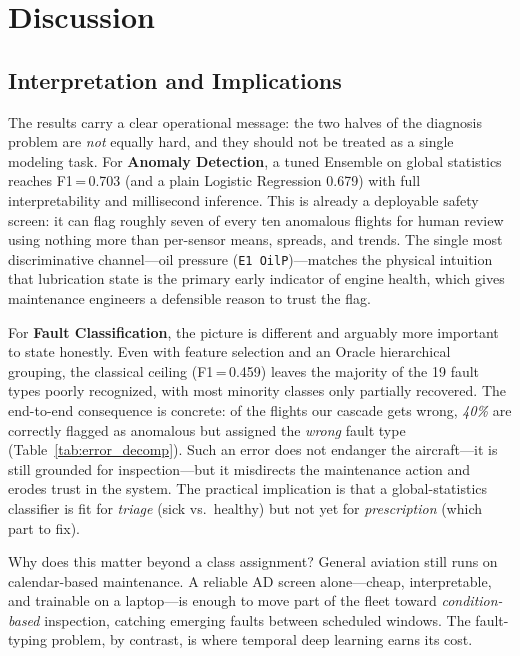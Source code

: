 \section{Discussion}
\label{sec:discussion}

\subsection{Interpretation and Implications}
\label{subsec:implications}

The results carry a clear operational message: the two halves of the diagnosis
problem are \emph{not} equally hard, and they should not be treated as a single
modeling task. For \textbf{Anomaly Detection}, a tuned Ensemble on global
statistics reaches F1\,=\,0.703 (and a plain Logistic Regression 0.679) with full
interpretability and millisecond inference. This is already a deployable safety
screen: it can flag roughly seven of every ten anomalous flights for human review
using nothing more than per-sensor means, spreads, and trends. The single most discriminative
channel---oil pressure (\texttt{E1 OilP})---matches the physical intuition that
lubrication state is the primary early indicator of engine health, which gives
maintenance engineers a defensible reason to trust the flag.

For \textbf{Fault Classification}, the picture is different and arguably more
important to state honestly. Even with feature selection and an Oracle
hierarchical grouping, the classical ceiling (F1\,=\,0.459) leaves the majority
of the 19 fault types poorly recognized, with most minority classes only
partially recovered. The end-to-end consequence is
concrete: of the flights our cascade gets wrong, \emph{40\%} are correctly
flagged as anomalous but assigned the \emph{wrong} fault type
(Table~\ref{tab:error_decomp}). Such an error does not endanger the aircraft---it
is still grounded for inspection---but it misdirects the maintenance action and
erodes trust in the system. The practical implication is that a global-statistics
classifier is fit for \emph{triage} (sick vs.\ healthy) but not yet for
\emph{prescription} (which part to fix).

Why does this matter beyond a class assignment? General aviation still runs on
calendar-based maintenance. A reliable AD screen alone---cheap, interpretable,
and trainable on a laptop---is enough to move part of the fleet toward
\emph{condition-based} inspection, catching emerging faults between scheduled
windows. The fault-typing problem, by contrast, is where temporal deep learning
earns its cost.

